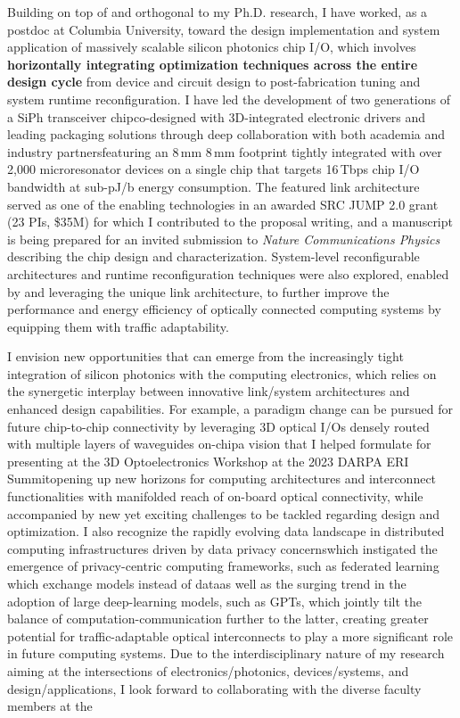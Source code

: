Building on top of and orthogonal to my Ph.D. research, I have worked, as a postdoc at Columbia University, toward the design implementation and system application of massively scalable silicon photonics chip I/O, which involves \textbf{horizontally integrating optimization techniques across the entire design cycle} from device and circuit design to post-fabrication tuning and system runtime reconfiguration. I have led the development of two generations of a SiPh transceiver chip\textemdash co-designed with 3D-integrated electronic drivers and leading packaging solutions through deep collaboration with both academia and industry partners\textemdash featuring an 8\,mm \texttimes{} 8\,mm footprint tightly integrated with over 2,000 microresonator devices on a single chip that targets 16\,Tbps chip I/O bandwidth at sub-pJ/b energy consumption. The featured link architecture served as one of the enabling technologies in an awarded SRC JUMP 2.0 grant (23 PIs, \$35M) for which I contributed to the proposal writing, and a manuscript is being prepared for an invited submission to \emph{Nature Communications Physics} describing the chip design and characterization. System-level reconfigurable architectures and runtime reconfiguration techniques were also explored, enabled by and leveraging the unique link architecture, to further improve the performance and energy efficiency of optically connected computing systems by equipping them with traffic adaptability.

I envision new opportunities that can emerge from the increasingly tight integration of silicon photonics with the computing electronics, which relies on the synergetic interplay between innovative link/system architectures and enhanced design capabilities. For example, a paradigm change can be pursued for future chip-to-chip connectivity by leveraging 3D optical I/Os densely routed with multiple layers of waveguides on-chip\textemdash a vision that I helped formulate for presenting at the 3D Optoelectronics Workshop at the 2023 DARPA ERI Summit\textemdash opening up new horizons for
computing architectures and interconnect functionalities with manifolded reach of on-board optical connectivity, while accompanied by new yet exciting challenges to be tackled regarding design and optimization. I also recognize the rapidly evolving data landscape in distributed computing infrastructures driven by data privacy concerns\textemdash which instigated the emergence of privacy-centric computing frameworks, such as federated learning which exchange models instead of data\textemdash as well as the surging trend in the adoption of large deep-learning models, such as GPTs, which jointly tilt the balance of computation-communication further to the latter, creating greater potential for traffic-adaptable optical interconnects to play a more significant role in future computing systems. Due to the interdisciplinary nature of my research aiming at the intersections of electronics/photonics, devices/systems, and design/applications, I look forward to collaborating with the diverse faculty members at the \appSchool{}%